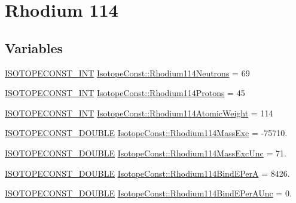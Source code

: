 \hypertarget{group___isotope_const-_rhodium-_rh114}{}\section{Rhodium 114}
\label{group___isotope_const-_rhodium-_rh114}
\subsection*{Variables}
\begin{DoxyCompactItemize}
\item 
\mbox{\hyperlink{group___isotope_const-_macros_ga5f18360b3e99483a35c32d789e62621c}{I\+S\+O\+T\+O\+P\+E\+C\+O\+N\+S\+T\+\_\+\+I\+NT}} \mbox{\hyperlink{group___isotope_const-_rhodium-_rh114_ga94cf4aa313c95ae04ae8ef70149b4fd6}{Isotope\+Const\+::\+Rhodium114\+Neutrons}} = 69
\item 
\mbox{\hyperlink{group___isotope_const-_macros_ga5f18360b3e99483a35c32d789e62621c}{I\+S\+O\+T\+O\+P\+E\+C\+O\+N\+S\+T\+\_\+\+I\+NT}} \mbox{\hyperlink{group___isotope_const-_rhodium-_rh114_ga53e326c8d8b9c34d8e99b5dc4df99931}{Isotope\+Const\+::\+Rhodium114\+Protons}} = 45
\item 
\mbox{\hyperlink{group___isotope_const-_macros_ga5f18360b3e99483a35c32d789e62621c}{I\+S\+O\+T\+O\+P\+E\+C\+O\+N\+S\+T\+\_\+\+I\+NT}} \mbox{\hyperlink{group___isotope_const-_rhodium-_rh114_ga963dad933747143541ce18593ac76c91}{Isotope\+Const\+::\+Rhodium114\+Atomic\+Weight}} = 114
\item 
\mbox{\hyperlink{group___isotope_const-_macros_ga8f45a7272ce02c0b4c65c44636ed719a}{I\+S\+O\+T\+O\+P\+E\+C\+O\+N\+S\+T\+\_\+\+D\+O\+U\+B\+LE}} \mbox{\hyperlink{group___isotope_const-_rhodium-_rh114_ga05adaa4683e61ce9d24cfad9f94d1f53}{Isotope\+Const\+::\+Rhodium114\+Mass\+Exc}} = -\/75710.
\item 
\mbox{\hyperlink{group___isotope_const-_macros_ga8f45a7272ce02c0b4c65c44636ed719a}{I\+S\+O\+T\+O\+P\+E\+C\+O\+N\+S\+T\+\_\+\+D\+O\+U\+B\+LE}} \mbox{\hyperlink{group___isotope_const-_rhodium-_rh114_gab5472fbe31b5fe8eb36ca4e52de5b303}{Isotope\+Const\+::\+Rhodium114\+Mass\+Exc\+Unc}} = 71.
\item 
\mbox{\hyperlink{group___isotope_const-_macros_ga8f45a7272ce02c0b4c65c44636ed719a}{I\+S\+O\+T\+O\+P\+E\+C\+O\+N\+S\+T\+\_\+\+D\+O\+U\+B\+LE}} \mbox{\hyperlink{group___isotope_const-_rhodium-_rh114_ga4e3c7b99b3bfe33bcf15b96b6625226f}{Isotope\+Const\+::\+Rhodium114\+Bind\+E\+PerA}} = 8426.
\item 
\mbox{\hyperlink{group___isotope_const-_macros_ga8f45a7272ce02c0b4c65c44636ed719a}{I\+S\+O\+T\+O\+P\+E\+C\+O\+N\+S\+T\+\_\+\+D\+O\+U\+B\+LE}} \mbox{\hyperlink{group___isotope_const-_rhodium-_rh114_gac2898e0e74257c1794df614acca9c4e1}{Isotope\+Const\+::\+Rhodium114\+Bind\+E\+Per\+A\+Unc}} = 0.

\end{DoxyCompactItemize}
